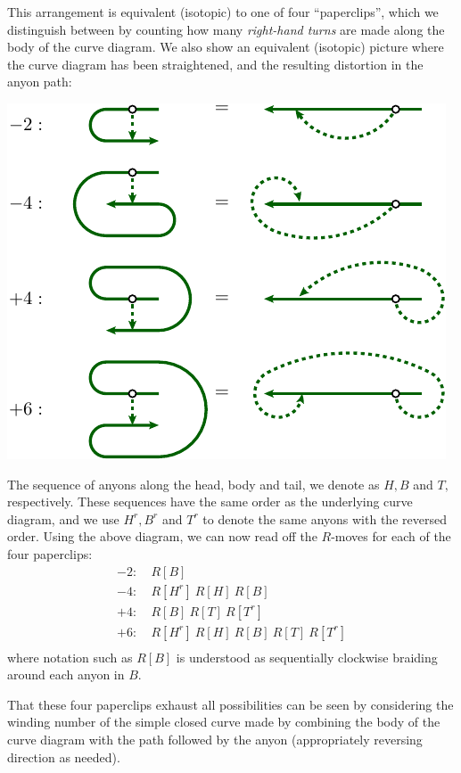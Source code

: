 \documentclass[aps, prl, letterpaper, twocolumn, superscriptaddress, notitlepage, 10pt]{revtex4-1}
\begin{document}
This arrangement is equivalent (isotopic) to one of four 
``paperclips'', which we distinguish between by counting how
many \emph{right-hand turns} are made along the body of the curve diagram.
We also show an equivalent (isotopic) picture where the
curve diagram has been straightened, and the resulting distortion
in the anyon path:
\begin{center}
\includegraphics[]{pic-paperclip.pdf}
\end{center}
The sequence of anyons along the head, body and tail, we denote as $H, B$ and $T,$
respectively.
These sequences have the same order as the underlying curve diagram, and 
we use
$H^r, B^r$ and $T^r$ to denote the same anyons with the reversed order.
Using the above diagram, we can now read off the $R$-moves for each
of the four paperclips:
\begin{align*}
-2:&\ R[B] \\
-4:&\ R[H^r]\ R[H]\ R[B] \\
+4:&\ R[B]\ R[T]\ R[T^r] \\
+6:&\ R[H^r]\ R[H]\ R[B]\ R[T]\ R[T^r] \\
\end{align*}
where notation such as $R[B]$ is understood as sequentially clockwise braiding around
each anyon in $B$.

That these four paperclips exhaust all possibilities can be seen by
considering the winding number of the simple closed curve made
by combining the body of the curve diagram with the path followed by
the anyon (appropriately reversing direction as needed).
\end{document}
